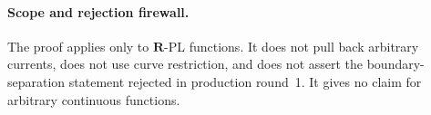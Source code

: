 \paragraph{Scope and rejection firewall.}
The proof applies only to $\mathbf R$-PL functions.  It does not pull back
arbitrary currents, does not use curve restriction, and does not assert the
boundary-separation statement rejected in production round~1.  It gives no
claim for arbitrary continuous functions.
